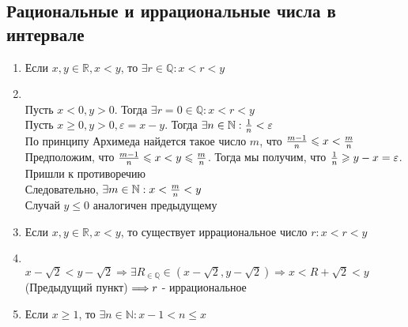 \documentclass[12pt,letterpaper]{report}
\makeatletter
\theoremstyle{definition}
\newcommand{\Q}{\mathbb{Q}}
\renewenvironment{proof}[1][\proofname]{%
   \par\pushQED{\qed}\normalfont%
   \topsep6\p@\@plus6\p@\relax
   \trivlist\item[\hskip\labelsep\bfseries#1\@addpunct{.}]%
   \ignorespaces
}{%
   \popQED\endtrivlist\@endpefalse
}
\makeatother
\begin{document}
\subsection{Рациональные и иррациональные числа в интервале}
\begin{enumerate}
    \item Если $x, y \in \mathbb{R}, x < y$, то $\exists r \in \mathbb{Q}: x < r < y$ 
    \begin{proof}
        \quad \\ Пусть $x < 0, y > 0$. Тогда $\exists r = 0 \in \mathbb{Q}: x < r < y$ \\
        Пусть $x \geqslant 0, y > 0, \varepsilon = x - y$. Тогда $\exists n \in \mathbb{N}: {{1}\over{n}} < \varepsilon$ \\
        По принципу Архимеда найдется такое число $m$, что ${{m-1}\over{n}} \leqslant x < {{m}\over{n}}$ \vspace{0.2cm} \\
        Предположим, что ${{m-1}\over{n}} \leqslant x < y \leqslant {{m}\over{n}}$. Тогда мы получим, что ${{1}\over{n}} \geqslant y - x = \varepsilon$.
        Пришли к противоречию\\
        Следовательно, $\exists m \in \mathbb{N} : x < {{m}\over{n}} < y$ \\
        Случай $y \leqslant 0$ аналогичен предыдущему
    \end{proof} 
    \item Если $x, y \in \mathbb{R}, x < y$, то существует иррациональное число $r: x < r < y$ 
    \begin{proof}
        \quad \\ $x - \sqrt{2} < y - \sqrt{2} \Longrightarrow \exists R_{\in \Q} \in (x - \sqrt{2}, y - \sqrt{2}) \Longrightarrow
        x < R + \sqrt{2} < y \; $(Предыдущий пункт)$ \; \Longrightarrow \\ r$ - иррациональное
    \end{proof} 
    \item Если $x \geqslant 1$, то $\exists n \in \mathbb{N}: x - 1 < n \leqslant x$ 
\end{enumerate}
\end{document}
